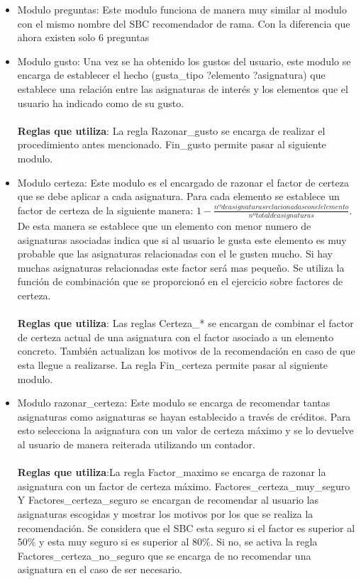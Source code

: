 \begin{itemize}
   \item Modulo preguntas: Este modulo funciona de manera muy similar al modulo con el mismo nombre del SBC recomendador de rama. Con la diferencia que ahora existen solo 6 preguntas

   \item Modulo gusto: Una vez se ha obtenido los gustos del usuario, este modulo se encarga de establecer el hecho (gusta\_tipo ?elemento ?asignatura) que establece una relación entre las asignaturas de interés y los elementos que el usuario ha indicado como de su gusto.
   \\\\
   \textbf{Reglas que utiliza}: La regla Razonar\_gusto se encarga de realizar el procedimiento antes mencionado. Fin\_gusto permite pasar al siguiente modulo.

   \item Modulo certeza: Este modulo es el encargado de razonar el factor de certeza que se debe aplicar a cada asignatura. Para cada elemento se establece un factor de certeza de la siguiente manera: $1 - \frac{nº de asignaturas relacionadas con el elemento}{nº total de asignaturas}$. De esta manera se establece que un elemento con menor numero de asignaturas asociadas indica que si al usuario le gusta este elemento es muy probable que las asignaturas relacionadas con el le gusten mucho. Si hay muchas asignaturas relacionadas este factor será mas pequeño. Se utiliza la función de combinación que se proporcionó en el ejercicio sobre factores de certeza.
   \\\\
   \textbf{Reglas que utiliza}: Las reglas Certeza\_* se encargan de combinar el factor de certeza actual de una asignatura con el factor asociado a un elemento concreto. También actualizan los motivos de la recomendación en caso de que esta llegue a realizarse. La regla Fin\_certeza permite pasar al siguiente modulo.

   \item Modulo razonar\_certeza: Este modulo se encarga de recomendar tantas asignaturas como asignaturas se hayan establecido a través de créditos. Para esto selecciona la asignatura con un valor de certeza máximo y se lo devuelve al usuario de manera reiterada utilizando un contador.
   \\\\
   \textbf{Reglas que utiliza}:La regla Factor\_maximo se encarga de razonar la asignatura con un factor de certeza máximo. Factores\_certeza\_muy\_seguro Y Factores\_certeza\_seguro se encargan de recomendar al usuario las asignaturas escogidas y mostrar los motivos por los que se realiza la recomendación. Se considera que el SBC esta seguro si el factor es superior al 50\% y esta muy seguro si es superior al 80\%. Si no, se activa la regla Factores\_certeza\_no\_seguro que se encarga de no recomendar una asignatura en el caso de ser necesario.

\end{itemize}


